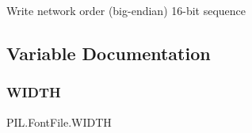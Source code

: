 \begin{DoxyVerb}Write network order (big-endian) 16-bit sequence\end{DoxyVerb}
 

\subsection{Variable Documentation}
\mbox{\label{namespacePIL_1_1FontFile_ada31ea014868fb49088ab57c6a8e17ce}} 
\subsubsection{\texorpdfstring{W\+I\+D\+TH}{WIDTH}}
{\footnotesize\ttfamily P\+I\+L.\+Font\+File.\+W\+I\+D\+TH}

